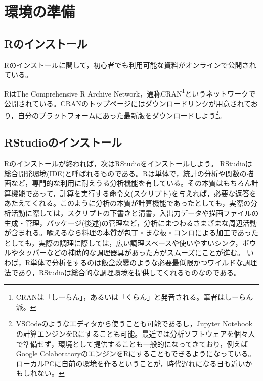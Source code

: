 \documentclass[
  a4paper,
]{ltjsbook}
\begin{document}
\hypertarget{ux74b0ux5883ux306eux6e96ux5099-1}{%
\section{環境の準備}\label{ux74b0ux5883ux306eux6e96ux5099-1}}

\hypertarget{rux306eux30a4ux30f3ux30b9ux30c8ux30fcux30eb-1}{%
\subsection{Rのインストール}\label{rux306eux30a4ux30f3ux30b9ux30c8ux30fcux30eb-1}}

Rのインストールに関して，初心者でも利用可能な資料がオンラインで公開されている。

RはThe \href{https://cran.r-project.org/}{Comprehensive R Archive
Network}，通称CRAN\footnote{CRANは「しーらん」，あるいは「くらん」と発音される。筆者はしーらん派。}というネットワークで公開されている。CRANのトップページにはダウンロードリンクが用意されており，自分のプラットフォームにあった最新版をダウンロードしよう\footnote{VSCodeのようなエディタから使うことも可能であるし，Jupyter
  Notebookの計算エンジンをRにすることも可能。最近では分析ソフトウェアを個々人で準備せず，環境として提供することも一般的になってきており，例えば\href{https://colab.research.google.com/}{Google
  Colaboratory}のエンジンをRにすることもできるようになっている。ローカルPCに自前の環境を作るということが，時代遅れになる日も近いかもしれない。}。

\hypertarget{rstudioux306eux30a4ux30f3ux30b9ux30c8ux30fcux30eb-1}{%
\subsection{RStudioのインストール}\label{rstudioux306eux30a4ux30f3ux30b9ux30c8ux30fcux30eb-1}}

Rのインストールが終われば，次はRStudioをインストールしよう。
RStudioは総合開発環境(IDE)と呼ばれるものである。Rは単体で，統計の分析や関数の描画など，専門的な利用に耐えうる分析機能を有している。その本質はもちろん計算機能であって，計算を実行する命令文(スクリプト)を与えれば，必要な返答をあたえてくれる。このように分析の本質が計算機能であったとしても，実際の分析活動に際しては，スクリプトの下書きと清書，入出力データや描画ファイルの生成・管理，パッケージ(後述)の管理など，分析にまつわるさまざまな周辺活動が含まれる。喩えるなら料理の本質が包丁・まな板・コンロによる加工であったとしても，実際の調理に際しては，広い調理スペースや使いやすいシンク，ボウルやタッパーなどの補助的な調理器具があった方がスムーズにことが進む。
いわば，R単体で分析をするのは飯盒炊爨のような必要最低限かつワイルドな調理法であり，RStudioは総合的な調理環境を提供してくれるものなのである。
\end{document}

